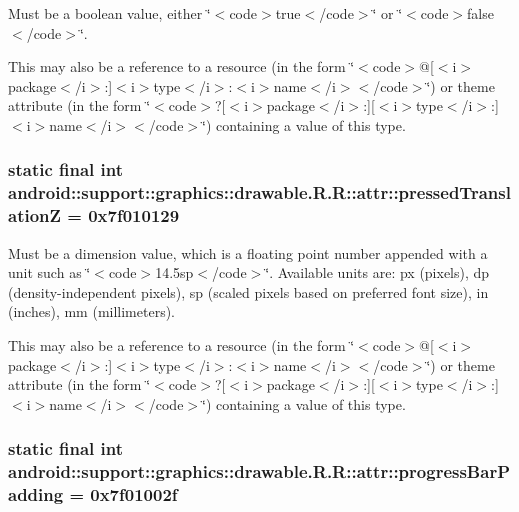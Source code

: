 Must be a boolean value, either \char`\"{}$<$code$>$true$<$/code$>$\char`\"{} or \char`\"{}$<$code$>$false$<$/code$>$\char`\"{}. 

This may also be a reference to a resource (in the form \char`\"{}$<$code$>$@\mbox{[}$<$i$>$package$<$/i$>$:\mbox{]}$<$i$>$type$<$/i$>$:$<$i$>$name$<$/i$>$$<$/code$>$\char`\"{}) or theme attribute (in the form \char`\"{}$<$code$>$?\mbox{[}$<$i$>$package$<$/i$>$:\mbox{]}\mbox{[}$<$i$>$type$<$/i$>$:\mbox{]}$<$i$>$name$<$/i$>$$<$/code$>$\char`\"{}) containing a value of this type. \hypertarget{classandroid_1_1support_1_1graphics_1_1drawable_1_1_r_1_1attr_15cc0e32ca77c0ca66539c3c300967f9}{
\subsubsection[{pressedTranslationZ}]{\setlength{\rightskip}{0pt plus 5cm}static final int android::support::graphics::drawable.R.R::attr::pressedTranslationZ = 0x7f010129}}
\label{classandroid_1_1support_1_1graphics_1_1drawable_1_1_r_1_1attr_15cc0e32ca77c0ca66539c3c300967f9}


Must be a dimension value, which is a floating point number appended with a unit such as \char`\"{}$<$code$>$14.5sp$<$/code$>$\char`\"{}. Available units are: px (pixels), dp (density-independent pixels), sp (scaled pixels based on preferred font size), in (inches), mm (millimeters). 

This may also be a reference to a resource (in the form \char`\"{}$<$code$>$@\mbox{[}$<$i$>$package$<$/i$>$:\mbox{]}$<$i$>$type$<$/i$>$:$<$i$>$name$<$/i$>$$<$/code$>$\char`\"{}) or theme attribute (in the form \char`\"{}$<$code$>$?\mbox{[}$<$i$>$package$<$/i$>$:\mbox{]}\mbox{[}$<$i$>$type$<$/i$>$:\mbox{]}$<$i$>$name$<$/i$>$$<$/code$>$\char`\"{}) containing a value of this type. \hypertarget{classandroid_1_1support_1_1graphics_1_1drawable_1_1_r_1_1attr_ff7c80cbcd6c870b4043b9a404798b38}{
\subsubsection[{progressBarPadding}]{\setlength{\rightskip}{0pt plus 5cm}static final int android::support::graphics::drawable.R.R::attr::progressBarPadding = 0x7f01002f}}
\label{classandroid_1_1support_1_1graphics_1_1drawable_1_1_r_1_1attr_ff7c80cbcd6c870b4043b9a404798b38}


